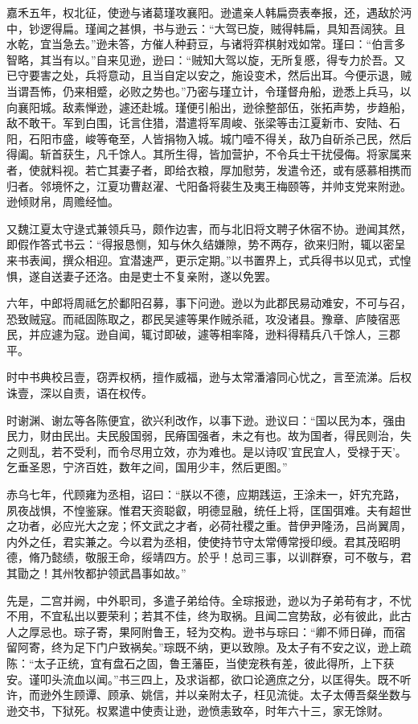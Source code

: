 \documentclass[12pt,UTF8]{ctexbook}
\begin{document}
嘉禾五年，权北征，使逊与诸葛瑾攻襄阳。逊遣亲人韩扁赍表奉报，还，遇敌於沔中，钞逻得扁。瑾闻之甚惧，书与逊云：“大驾已旋，贼得韩扁，具知吾阔狭。且水乾，宜当急去。”逊未答，方催人种葑豆，与诸将弈棋射戏如常。瑾曰：“伯言多智略，其当有以。”自来见逊，逊曰：“贼知大驾以旋，无所复慼，得专力於吾。又已守要害之处，兵将意动，且当自定以安之，施设变术，然后出耳。今便示退，贼当谓吾怖，仍来相蹙，必败之势也。”乃密与瑾立计，令瑾督舟船，逊悉上兵马，以向襄阳城。敌素惮逊，遽还赴城。瑾便引船出，逊徐整部伍，张拓声势，步趋船，敌不敢干。军到白围，讬言住猎，潜遣将军周峻、张梁等击江夏新市、安陆、石阳，石阳市盛，峻等奄至，人皆捐物入城。城门噎不得关，敌乃自斫杀己民，然后得阖。斩首获生，凡千馀人。其所生得，皆加营护，不令兵士干扰侵侮。将家属来者，使就料视。若亡其妻子者，即给衣粮，厚加慰劳，发遣令还，或有感慕相携而归者。邻境怀之，江夏功曹赵濯、弋阳备将裴生及夷王梅颐等，并帅支党来附逊。逊倾财帛，周赡经恤。

又魏江夏太守逯式兼领兵马，颇作边害，而与北旧将文聘子休宿不协。逊闻其然，即假作答式书云：“得报恳恻，知与休久结嫌隙，势不两存，欲来归附，辄以密呈来书表闻，撰众相迎。宜潜速严，更示定期。”以书置界上，式兵得书以见式，式惶惧，遂自送妻子还洛。由是吏士不复亲附，遂以免罢。

六年，中郎将周祗乞於鄱阳召募，事下问逊。逊以为此郡民易动难安，不可与召，恐致贼寇。而祗固陈取之，郡民吴遽等果作贼杀祗，攻没诸县。豫章、庐陵宿恶民，并应遽为寇。逊自闻，辄讨即破，遽等相率降，逊料得精兵八千馀人，三郡平。

时中书典校吕壹，窃弄权柄，擅作威福，逊与太常潘濬同心忧之，言至流涕。后权诛壹，深以自责，语在权传。

时谢渊、谢厷等各陈便宜，欲兴利改作，以事下逊。逊议曰：“国以民为本，强由民力，财由民出。夫民殷国弱，民瘠国强者，未之有也。故为国者，得民则治，失之则乱，若不受利，而令尽用立效，亦为难也。是以诗叹'宜民宜人，受禄于天'。乞垂圣恩，宁济百姓，数年之间，国用少丰，然后更图。”

赤乌七年，代顾雍为丞相，诏曰：“朕以不德，应期践运，王涂未一，奸宄充路，夙夜战惧，不惶鉴寐。惟君天资聪叡，明德显融，统任上将，匡国弭难。夫有超世之功者，必应光大之宠；怀文武之才者，必荷社稷之重。昔伊尹隆汤，吕尚翼周，内外之任，君实兼之。今以君为丞相，使使持节守太常傅常授印绶。君其茂昭明德，脩乃懿绩，敬服王命，绥靖四方。於乎！总司三事，以训群寮，可不敬与，君其勖之！其州牧都护领武昌事如故。”

先是，二宫并阙，中外职司，多遣子弟给侍。全琮报逊，逊以为子弟苟有才，不忧不用，不宜私出以要荣利；若其不佳，终为取祸。且闻二宫势敌，必有彼此，此古人之厚忌也。琮子寄，果阿附鲁王，轻为交构。逊书与琮曰：“卿不师日䃅，而宿留阿寄，终为足下门户致祸矣。”琮既不纳，更以致隙。及太子有不安之议，逊上疏陈：“太子正统，宜有盘石之固，鲁王藩臣，当使宠秩有差，彼此得所，上下获安。谨叩头流血以闻。”书三四上，及求诣都，欲口论適庶之分，以匡得失。既不听许，而逊外生顾谭、顾承、姚信，并以亲附太子，枉见流徙。太子太傅吾粲坐数与逊交书，下狱死。权累遣中使责让逊，逊愤恚致卒，时年六十三，家无馀财。
\end{document}
